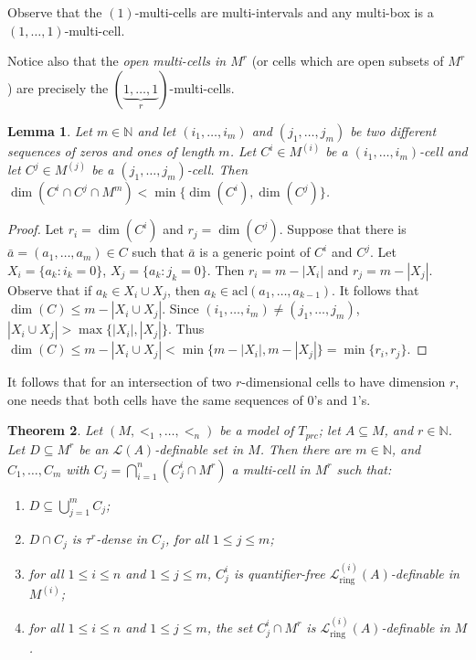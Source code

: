 \documentclass[12pt]{article}
\newtheorem{thm}{Theorem}[section]
\newtheorem{lem}[thm]{Lemma}
\theoremstyle{definition}
\theoremstyle{mystyle}
\theoremstyle{remark}
\newcommand{\LC}{\mathcal{L}}
\newcommand{\Li}{\mathcal{L}^{(i)}_{\text{ring}}}
\newcommand{\clos}[2]{#1^{(#2)}}
\newcommand{\acl}{\mathrm{acl}}
\begin{document}
Observe that the $(1)$-multi-cells are multi-intervals and any
multi-box is a $(1,\ldots, 1)$-multi-cell.

Notice also that the \emph{open multi-cells in $M^r$} (or cells
which are open subsets of $M^r$) are precisely the
$\left(\underbrace{1, \ldots, 1}_{r}\right)$-multi-cells.




\begin{lem}\label{DimCells}
Let $m\in \mathbb{N}$ and let $(i_1, \ldots, i_m)$ and $(j_1,
\ldots, j_m)$ be two different sequences of zeros and ones of
length $m$. Let $C^i \in \clos{M}{i}$ be a $(i_1, \ldots,
i_m)$-cell and let  $C^j \in \clos{M}{j}$ be a $(j_1, \ldots,
j_m)$-cell. Then $\dim(C^i \cap C^j \cap M^m) < \min\{\dim(C^i),
\dim(C^j)\}$.
\end{lem}



\begin{proof}
Let $r_i= \dim(C^i)$ and $r_j = \dim(C^j)$.
Suppose that there is $\bar{a} = (a_1, \ldots, a_m) \in C $ such that $\bar{a}$ is a generic point of $C^i$ and $C^j$.
Let $X_i= \{a_k: i_k=0\}$, $X_j=\{a_k: j_k=0\}$. Then $r_i = m - |X_i|$ and $r_j = m - |X_j|$.
Observe that if $a_k \in X_i \cup X_j$, then $a_k \in \acl(a_1, \ldots, a_{k-1})$.
It follows that $\dim(C) \leq m - |X_i \cup X_j|$.
Since $(i_1, \ldots, i_m) \not = (j_1, \ldots, j_m)$, $|X_i \cup X_j| > \max\{|X_i|, |X_j|\}$.
Thus $\dim(C) \leq m - |X_i \cup X_j| < \min\{m - |X_i|, m - |X_j|\}= \min\{r_i, r_j\}$.
\end{proof}


It follows that for an intersection of two $r$-dimensional cells
to have dimension $r$, one needs that both cells have the same
sequences of $0$'s and $1$'s.


\begin{thm}\label{Cell-decom}
Let $(M, <_1, \ldots, <_n)$ be a  model of $T_{prc}$; let $A \subseteq M$, and $r \in \mathbb{N}$. Let $D \subseteq M^r$ be an $\LC(A)$-definable set in $M$.
Then there are $m \in \mathbb{N}$, and $C_1, \ldots, C_m$ with $C_j= \displaystyle{\bigcap_{i=1}^n (C^i_j\cap M^r)}$ a multi-cell in $M^r$ such that:
\begin{enumerate}
\item $D \subseteq \displaystyle{\bigcup_{j=1}^m C_ j}$;
\item $D \cap C_j$ is $\tau^r$-dense in $C_j$, for all $1 \leq j \leq m$;
\item for all $1 \leq i\leq n$ and $1\leq j\leq m$, $C^i_j$ is quantifier-free $\Li(A)$-definable in $\clos{M}{i}$;
\item for all $1 \leq i \leq n$ and $1 \leq j \leq m$, the set $C^i_j\cap M^r$ is $\Li(A)$-definable in $M$.
 \end{enumerate}
\end{thm}
\end{document}
